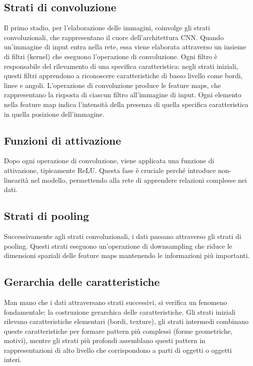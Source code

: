 \documentclass[a4paper,12pt]{report}
\begin{document}
	\subsection{Strati di convoluzione}
	Il primo stadio, per l'elaborazione delle immagini, coinvolge gli strati convoluzionali, che rappresentano il cuore dell’architettura CNN. Quando un’immagine di input entra nella rete, essa viene elaborata attraverso un insieme di filtri (kernel) che eseguono l’operazione di convoluzione. Ogni filtro è responsabile del rilevamento di una specifica caratteristica: negli strati iniziali, questi filtri apprendono a riconoscere caratteristiche di basso livello come bordi, linee e angoli. L’operazione di convoluzione produce le feature maps, che rappresentano la risposta di ciascun filtro all’immagine di input. Ogni elemento nella feature map indica l’intensità della presenza di quella specifica caratteristica in quella posizione dell’immagine.
	
	\subsection{Funzioni di attivazione}
	Dopo ogni operazione di convoluzione, viene applicata una funzione di attivazione, tipicamente ReLU. Questa fase è cruciale perché introduce non-linearità nel modello, permettendo alla rete di apprendere relazioni complesse nei dati.
	
	\subsection{Strati di pooling}
	Successivamente agli strati convoluzionali, i dati passano attraverso gli strati di pooling. Questi strati eseguono un’operazione di downsampling che riduce le dimensioni spaziali delle feature maps mantenendo le informazioni più importanti.
	
	\subsection{Gerarchia delle caratteristiche}
	Man mano che i dati attraversano strati successivi, si verifica un fenomeno fondamentale: la costruzione gerarchica delle caratteristiche. Gli strati iniziali rilevano caratteristiche elementari (bordi, texture), gli strati intermedi combinano queste caratteristiche per formare pattern più complessi (forme geometriche, motivi), mentre gli strati più profondi assemblano questi pattern in rappresentazioni di alto livello che corrispondono a parti di oggetti o oggetti interi.
	
\end{document}

